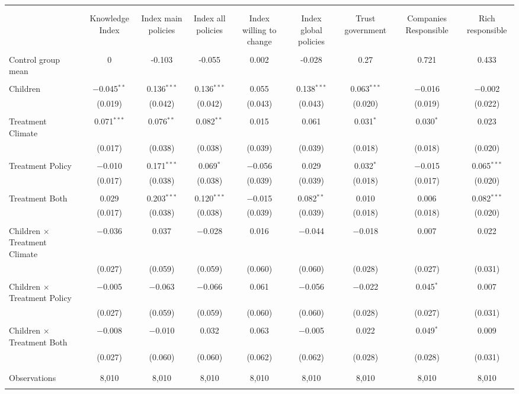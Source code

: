 
\begin{tabular}{@{\extracolsep{5pt}}lcccccccc} 
\\[-1.8ex]\hline 
\hline \\[-1.8ex] 
\\[-1.8ex] & Knowledge Index & Index main policies & Index all policies & Index willing to change & Index global policies & Trust government & Companies Responsible & Rich responsible \\ 
\hline \\[-1.8ex] 
 Control group mean & 0 & -0.103 & -0.055 & 0.002 & -0.028 & 0.27 & 0.721 & 0.433  \\ \hline \\[-1.8ex] Children & $-$0.045$^{**}$ & 0.136$^{***}$ & 0.136$^{***}$ & 0.055 & 0.138$^{***}$ & 0.063$^{***}$ & $-$0.016 & $-$0.002 \\ 
  & (0.019) & (0.042) & (0.042) & (0.043) & (0.043) & (0.020) & (0.019) & (0.022) \\ 
  & & & & & & & & \\ 
 Treatment Climate & 0.071$^{***}$ & 0.076$^{**}$ & 0.082$^{**}$ & 0.015 & 0.061 & 0.031$^{*}$ & 0.030$^{*}$ & 0.023 \\ 
  & (0.017) & (0.038) & (0.038) & (0.039) & (0.039) & (0.018) & (0.018) & (0.020) \\ 
  & & & & & & & & \\ 
 Treatment Policy & $-$0.010 & 0.171$^{***}$ & 0.069$^{*}$ & $-$0.056 & 0.029 & 0.032$^{*}$ & $-$0.015 & 0.065$^{***}$ \\ 
  & (0.017) & (0.038) & (0.038) & (0.039) & (0.039) & (0.018) & (0.017) & (0.020) \\ 
  & & & & & & & & \\ 
 Treatment Both & 0.029 & 0.203$^{***}$ & 0.120$^{***}$ & $-$0.015 & 0.082$^{**}$ & 0.010 & 0.006 & 0.082$^{***}$ \\ 
  & (0.017) & (0.038) & (0.038) & (0.039) & (0.039) & (0.018) & (0.018) & (0.020) \\ 
  & & & & & & & & \\ 
 Children $\times$ Treatment Climate & $-$0.036 & 0.037 & $-$0.028 & 0.016 & $-$0.044 & $-$0.018 & 0.007 & 0.022 \\ 
  & (0.027) & (0.059) & (0.059) & (0.060) & (0.060) & (0.028) & (0.027) & (0.031) \\ 
  & & & & & & & & \\ 
 Children $\times$ Treatment Policy & $-$0.005 & $-$0.063 & $-$0.066 & 0.061 & $-$0.056 & $-$0.022 & 0.045$^{*}$ & 0.007 \\ 
  & (0.027) & (0.059) & (0.059) & (0.060) & (0.060) & (0.028) & (0.027) & (0.031) \\ 
  & & & & & & & & \\ 
 Children $\times$ Treatment Both & $-$0.008 & $-$0.010 & 0.032 & 0.063 & $-$0.005 & 0.022 & 0.049$^{*}$ & 0.009 \\ 
  & (0.027) & (0.060) & (0.060) & (0.062) & (0.062) & (0.028) & (0.028) & (0.031) \\ 
  & & & & & & & & \\ 
\hline \\[-1.8ex] 

Observations & 8,010 & 8,010 & 8,010 & 8,010 & 8,010 & 8,010 & 8,010 & 8,010 \\ 
\hline 
\hline \\[-1.8ex] 
\end{tabular} 